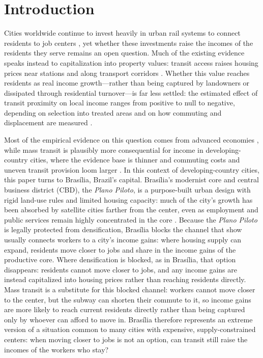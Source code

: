 \section{Introduction}\label{S:introduction}

Cities worldwide continue to invest heavily in urban rail systems to connect residents to job centers \citep{uitp2024globalmetro}, yet whether these investments raise the incomes of the residents they serve remains an open question. Much of the existing evidence speaks instead to capitalization into property values: transit access raises housing prices near stations and along transport corridors \citep{diaz1999impacts, cohen2007impacts, wrigley2001transport, koutsopoulos1977impact, hess2007impact}. Whether this value reaches residents as real income growth---rather than being captured by landowners or dissipated through residential turnover---is far less settled: the estimated effect of transit proximity on local income ranges from positive to null to negative, depending on selection into treated areas and on how commuting and displacement are measured \citep{banerjee2020road, fogel1962quantitative, fogel1964railroads}.

Most of the empirical evidence on this question comes from advanced economies \citep{mohammad2013meta, gonzalez2018subways}, while mass transit is plausibly more consequential for income in developing-country cities, where the evidence base is thinner and commuting costs and uneven transit provision loom larger \citep{tsivanidis2026evaluating, storeygard2025transportLMIC, moreno2016access, iimi2019jobaccessibility}. In this context of developing-country cities, this paper turns to Brasília, Brazil's capital. Brasília's modernist core and central business district (CBD), the \textit{Plano Piloto}, is a purpose-built urban design with rigid land-use rules and limited housing capacity: much of the city's growth has been absorbed by satellite cities farther from the center, even as employment and public services remain highly concentrated in the core \citep{de2025evolution, unesco1987brasilia, acioly1992brasilia}. Because the \textit{Plano Piloto} is legally protected from densification, Brasília blocks the channel that \cite{glaeser2018economic} show usually connects workers to a city's income gains: where housing supply can expand, residents move closer to jobs and share in the income gains of the productive core. Where densification is blocked, as in Brasília, that option disappears: residents cannot move closer to jobs, and any income gains are instead capitalized into housing prices rather than reaching residents directly. Mass transit is a substitute for this blocked channel: workers cannot move closer to the center, but the subway can shorten their commute to it, so income gains are more likely to reach current residents directly rather than being captured only by whoever can afford to move in. Brasília therefore represents an extreme version of a situation common to many cities with expensive, supply-constrained centers: when moving closer to jobs is not an option, can transit still raise the incomes of the workers who stay?

